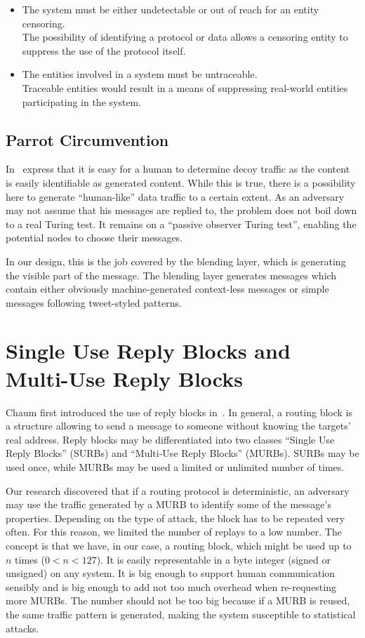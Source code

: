 \begin{itemize}
	\item The system must be either undetectable or out of reach for an entity censoring.\\
	The possibility of identifying a protocol or data allows a censoring entity to suppress the use of the protocol itself. 
	\item The entities involved in a system must be untraceable.\\
	Traceable entities would result in a means of suppressing real-world entities participating in the system.
\end{itemize}

\subsection{Parrot Circumvention}
In~\cite{oakland2013-parrot} \citeauthor{oakland2013-parrot} express that it is easy for a human to determine decoy traffic as the content is easily identifiable as generated content. While this is true, there is a possibility here to generate ``human-like'' data traffic to a certain extent. As an adversary may not assume that his messages are replied to, the problem does not boil down to a real Turing test. It remains on a ``passive observer Turing test'', enabling the potential nodes to choose their messages. 

In our design, this is the job covered by the blending layer, which is generating the visible part of the message. The blending layer generates messages which contain either obviously machine-generated context-less messages or simple messages following tweet-styled patterns. 

\section{Single Use Reply Blocks and Multi-Use Reply Blocks}
Chaum first introduced the use of reply blocks in~\cite{CHAUM1}. In general, a routing block is a structure allowing to send a message to someone without knowing the targets' real address. Reply blocks may be differentiated into two classes ``Single Use Reply Blocks'' (SURBs)  and ``Multi-Use Reply Blocks'' (MURBs). SURBs may be used once, while MURBs may be used a limited or unlimited number of times. 

Our research discovered that if a routing protocol is deterministic, an adversary may use the traffic generated by a MURB to identify some of the message's properties. Depending on the type of attack, the block has to be repeated very often. For this reason, we limited the number of replays to a low number. The concept is that we have, in our case, a routing block, which might be used up to $n$ times ($0<n<127$). It is easily representable in a byte integer (signed or unsigned) on any system. It is big enough to support human communication sensibly and is big enough to add not too much overhead when re-requesting more MURBs. The number should not be too big because if a MURB is reused, the same traffic pattern is generated, making the system susceptible to statistical attacks.

